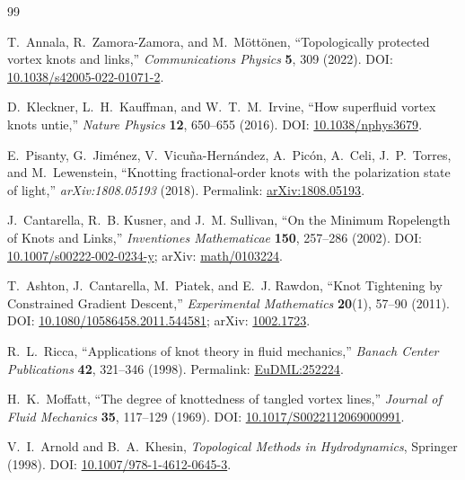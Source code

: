 \ifresearchtrackincluded\else
\begin{thebibliography}{99}

T.~Annala, R.~Zamora-Zamora, and M.~M{\"o}tt{\"o}nen,
``Topologically protected vortex knots and links,''
\emph{Communications Physics} \textbf{5}, 309 (2022).
DOI: \href{https://doi.org/10.1038/s42005-022-01071-2}{10.1038/s42005-022-01071-2}.

D.~Kleckner, L.~H.~Kauffman, and W.~T.~M.~Irvine,
``How superfluid vortex knots untie,''
\emph{Nature Physics} \textbf{12}, 650--655 (2016).
DOI: \href{https://doi.org/10.1038/nphys3679}{10.1038/nphys3679}.

E.~Pisanty, G.~Jim{\'e}nez, V.~Vicu{\~n}a-Hern{\'a}ndez, A.~Pic{\'o}n, A.~Celi, J.~P.~Torres, and M.~Lewenstein,
``Knotting fractional-order knots with the polarization state of light,''
\emph{arXiv:1808.05193} (2018).
Permalink: \href{https://arxiv.org/abs/1808.05193}{arXiv:1808.05193}.

J.~Cantarella, R.~B. Kusner, and J.~M. Sullivan,
``On the Minimum Ropelength of Knots and Links,''
\emph{Inventiones Mathematicae} \textbf{150}, 257--286 (2002).
DOI: \href{https://doi.org/10.1007/s00222-002-0234-y}{10.1007/s00222-002-0234-y};
arXiv: \href{https://arxiv.org/abs/math/0103224}{math/0103224}.

T.~Ashton, J.~Cantarella, M.~Piatek, and E.~J. Rawdon,
``Knot Tightening by Constrained Gradient Descent,''
\emph{Experimental Mathematics} \textbf{20}(1), 57--90 (2011).
DOI: \href{https://doi.org/10.1080/10586458.2011.544581}{10.1080/10586458.2011.544581};
arXiv: \href{https://arxiv.org/abs/1002.1723}{1002.1723}.


R.~L.~Ricca,
``Applications of knot theory in fluid mechanics,''
\emph{Banach Center Publications} \textbf{42}, 321--346 (1998).
Permalink: \href{https://eudml.org/doc/252224}{EuDML:252224}.

H.~K.~Moffatt,
``The degree of knottedness of tangled vortex lines,''
\emph{Journal of Fluid Mechanics} \textbf{35}, 117--129 (1969).
DOI: \href{https://doi.org/10.1017/S0022112069000991}{10.1017/S0022112069000991}.

V.~I.~Arnold and B.~A.~Khesin,
\emph{Topological Methods in Hydrodynamics},
Springer (1998).
DOI: \href{https://doi.org/10.1007/978-1-4612-0645-3}{10.1007/978-1-4612-0645-3}.

\end{thebibliography}
\fi


